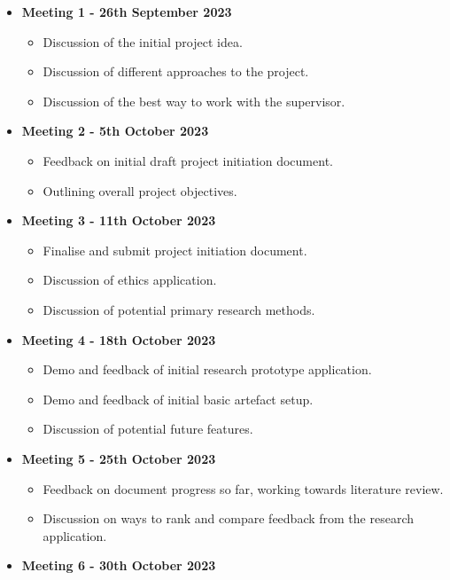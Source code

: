 \begin{itemize}
    \item \textbf{Meeting 1 - 26th September 2023}
    \begin{itemize}
        \item Discussion of the initial project idea.
        \item Discussion of different approaches to the project.
        \item Discussion of the best way to work with the supervisor.
    \end{itemize}
    \item \textbf{Meeting 2 - 5th October 2023}
    \begin{itemize}
        \item Feedback on initial draft project initiation document.
        \item Outlining overall project objectives.
    \end{itemize}
    \item \textbf{Meeting 3 - 11th October 2023}
    \begin{itemize}
        \item Finalise and submit project initiation document.
        \item Discussion of ethics application.
        \item Discussion of potential primary research methods.
    \end{itemize}
    \item \textbf{Meeting 4 - 18th October 2023}
    \begin{itemize}
        \item Demo and feedback of initial research prototype application.
        \item Demo and feedback of initial basic artefact setup.
        \item Discussion of potential future features.
    \end{itemize}
    \item \textbf{Meeting 5 - 25th October 2023}
    \begin{itemize}
        \item Feedback on document progress so far, working towards literature review.
        \item Discussion on ways to rank and compare feedback from the research application.
    \end{itemize}
    \item \textbf{Meeting 6 - 30th October 2023}
    \begin{itemize}

\end{itemize}
\end{itemize}
